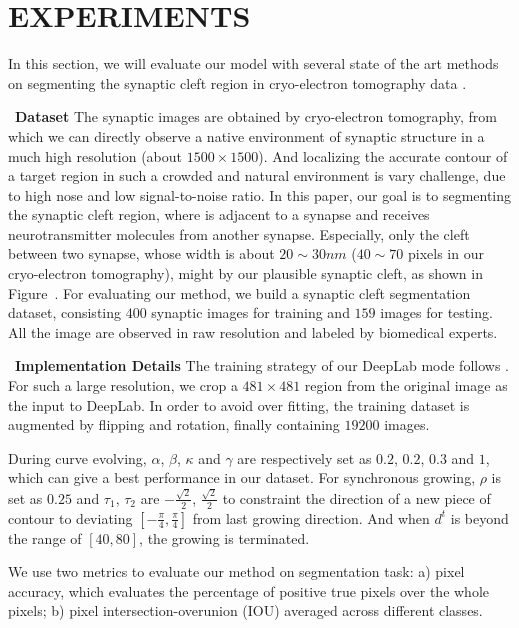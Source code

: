 \section{EXPERIMENTS}
In this section, we will evaluate our model with several state of the art methods on segmenting the synaptic cleft region in cryo-electron tomography data \cite{Lucic2005}.

~\noindent\textbf{Dataset}
The synaptic images are obtained by cryo-electron tomography, from which we can directly observe a native environment of synaptic structure in a much high resolution (about $1500\times 1500$).
And localizing the accurate contour of a target region in such a crowded and natural environment is vary challenge, due to high nose and low signal-to-noise ratio.
In this paper, our goal is to segmenting the synaptic cleft region, where is adjacent to a synapse and receives neurotransmitter molecules from another synapse.
Especially, only the cleft between two synapse, whose width is about $20\sim30nm$ ($40\sim70$ pixels in our cryo-electron tomography), might by our plausible synaptic cleft, as shown in Figure~.
For evaluating our method, we build a synaptic cleft segmentation dataset, consisting $400$ synaptic images for training and $159$ images for testing.
All the image are observed in raw resolution and labeled by biomedical experts.

~\noindent\textbf{Implementation Details}
The training strategy of our DeepLab mode follows \cite{Chen2016a}.
For such a large resolution, we crop a $481\times 481$ region \cite{Chen2016} from the original image as the input to DeepLab.
In order to avoid over fitting, the training dataset is augmented by flipping and rotation, finally containing $19200$ images.

During curve evolving, $\alpha$, $\beta$, $\kappa$ and $\gamma$ are respectively set as $0.2$, $0.2$, $0.3$ and $1$, which can give a best performance in our dataset.
For synchronous growing, $\rho$ is set as $0.25$ and $\tau_1$, $\tau_2$ are $-\frac{\sqrt{2}}{2}$, $\frac{\sqrt{2}}{2}$ to constraint the direction of a new piece of contour to deviating $[-\frac{\pi}{4},\frac{\pi}{4}]$ from last growing direction.
And when $d^{t}$ is beyond the range of $[40,80]$, the growing is terminated.

We use two metrics \cite{Cheng2017} to evaluate our method on segmentation task:
a) pixel accuracy, which evaluates the percentage of positive true pixels over the whole pixels;
b) pixel intersection-overunion (IOU) averaged across different classes.

